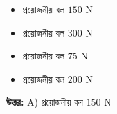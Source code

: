 \documentclass[12pt, a4paper]{article}
\begin{document}
\begin{itemize}[label={}, leftmargin=1cm, itemsep=0.5em]
    \item[\textbf{A)}] প্রয়োজনীয় বল $150\text{ N}$
    \item[\textbf{B)}] প্রয়োজনীয় বল $300\text{ N}$
    \item[\textbf{C)}] প্রয়োজনীয় বল $75\text{ N}$
    \item[\textbf{D)}] প্রয়োজনীয় বল $200\text{ N}$
\end{itemize}

\vspace{0.5em}
\begin{tcolorbox}[answerbox]
    \textbf{\color{success} উত্তর:} A) প্রয়োজনীয় বল $150\text{ N}$
\end{tcolorbox}
\vspace{1em}
\end{document}
